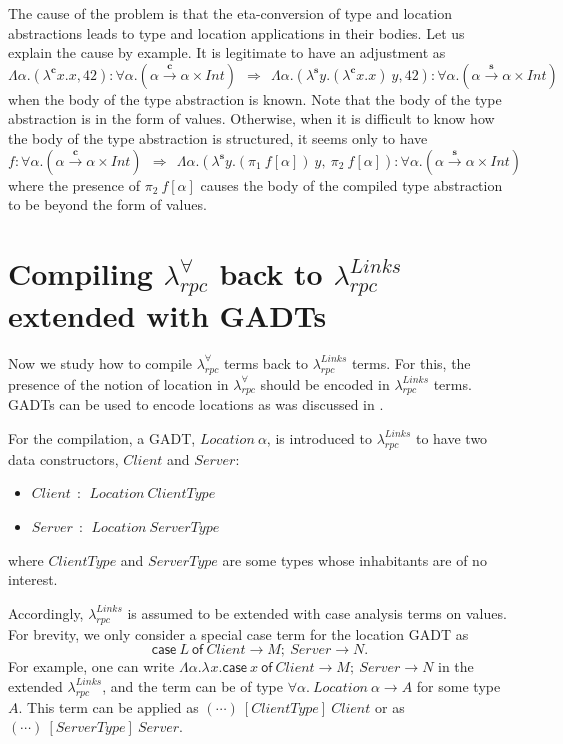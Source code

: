 \documentclass[a4paper]{article}
\theoremstyle{plain}
\theoremstyle{definition}
\newcommand{\polyrpc}{$\lambda_{rpc}^{\forall}$\xspace}
\newcommand{\linksrpc}{$\lambda_{rpc}^{Links}$\xspace}
\newcommand{\client}{\textbf{c}}
\newcommand{\server}{\textbf{s}}
\newcommand{\lamL}[3]{\lambda^{#1}#2.#3}
\newcommand{\textsfCase}{\textsf{case}}
\newcommand{\textsfOf}{\textsf{of}}
\newcommand{\case}[2]{\textsfCase ~ #1 ~\textsfOf ~ #2}
\newcommand{\funL}[1]{\xrightarrow{#1}}
\newcommand{\adjcomp}[4]{#1:#2 \Rightarrow #3:#4}
\begin{document}
%
The cause of the problem is that the eta-conversion of type and
location abstractions leads to type and location applications in their
bodies.
%
Let us explain the cause by example.
%
It is legitimate to have an adjustment as
\[
\adjcomp{\Lambda\alpha.(\lamL{\client}{x}{x}, 42)}
        {\forall\alpha.(\alpha\funL{\client}\alpha\times Int) \ \ }
        {\ \ \Lambda\alpha.(\lamL{\server}{y}{(\lamL{\client}{x}{x}) \ y}, 42)}
        {\forall\alpha.(\alpha\funL{\server}\alpha\times Int)}
\]
when the body of the type abstraction is known.
%
Note that the body of the type abstraction is in the form of values.
%
Otherwise, when it is difficult to know how the body of the type
abstraction is structured, it seems only to have
\[
\adjcomp{f}
        {\forall\alpha.(\alpha\funL{\client}\alpha\times Int) \ \ }
        {\ \ \Lambda\alpha.(\lamL{\server}{y}{ (\pi_1 \ f[\alpha]) \ y}, \ \pi_2 \ f[\alpha])}
        {\forall\alpha.(\alpha\funL{\server}\alpha\times Int)}
\]
where the presence of $\pi_2 \ f[\alpha]$ causes the body of the
compiled type abstraction to be beyond the form of values.


\section{Compiling {\polyrpc} back to {\linksrpc} extended with GADTs}
\label{sec:compilationwithgadts}


%
Now we study how to compile \polyrpc terms back to \linksrpc terms.
%
For this, the presence of the notion of location in \polyrpc should be
encoded in \linksrpc terms.
%
GADTs can be used to encode locations as was discussed in
\cite{CHOI:scp2020}.

%
For the compilation, a GADT, $Location \ \alpha$, is introduced to
\linksrpc to have two data constructors, $Client $ and $Server$:
\begin{itemize}
  \item $Client \ \ : \ \ Location \ ClientType$
  \item $Server \ \ : \ \ Location \ ServerType$
\end{itemize}
where $ClientType$ and $ServerType$ are some types whose
inhabitants are of no interest.

Accordingly, \linksrpc is assumed to be extended with case analysis
terms on values. For brevity, we only consider a special case term for
the location GADT as
\[
\case{L}{Client \rightarrow M; \ Server \rightarrow N}.
\]
%
For example, one can write $\Lambda\alpha.\lamL{}{x}{\case{x}{Client
    \rightarrow M; \ Server \rightarrow N}}$ in the
extended \linksrpc, and the term can be of type
$\forall\alpha. \ Location \ \alpha \rightarrow A$ for some type $A$.
%
This term can be applied as $(\cdots) \ [ClientType] \ Client$ or as
$(\cdots) \ [ServerType] \ Server$.
\end{document}
